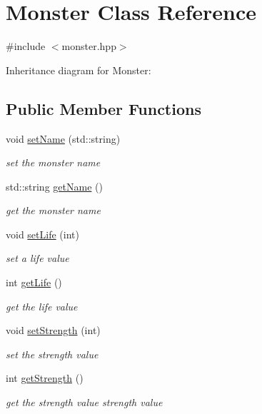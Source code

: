 \hypertarget{classMonster}{}\section{Monster Class Reference}
\label{classMonster}


{\ttfamily \#include $<$monster.\+hpp$>$}



Inheritance diagram for Monster\+:
\subsection*{Public Member Functions}
\begin{DoxyCompactItemize}
\item 
void \hyperlink{classMonster_ad9de6832808440f0d4877d72d1c531e4}{set\+Name} (std\+::string)
\begin{DoxyCompactList}\small\item\em set the monster name \end{DoxyCompactList}\item 
std\+::string \hyperlink{classMonster_a3f903085b1a1abb9f02c4e1b45aa08f1}{get\+Name} ()
\begin{DoxyCompactList}\small\item\em get the monster name \end{DoxyCompactList}\item 
void \hyperlink{classMonster_a690b68fafc373493d70bc89f231665f4}{set\+Life} (int)
\begin{DoxyCompactList}\small\item\em set a life value \end{DoxyCompactList}\item 
int \hyperlink{classMonster_a45556268c87162cd9ab2f827fd0ed5df}{get\+Life} ()
\begin{DoxyCompactList}\small\item\em get the life value \end{DoxyCompactList}\item 
void \hyperlink{classMonster_ab939733894fbcf5d5e54c39917150ba6}{set\+Strength} (int)
\begin{DoxyCompactList}\small\item\em set the strength value \end{DoxyCompactList}\item 
int \hyperlink{classMonster_a4a00f44c683fc00202a43460bd85cccb}{get\+Strength} ()
\begin{DoxyCompactList}\small\item\em get the strength value  strength value \end{DoxyCompactList}\item 

\end{DoxyCompactItemize}
